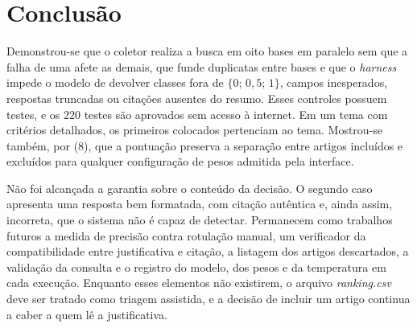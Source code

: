 \documentclass[10pt,a4paper,twocolumn]{article}
\newcommand{\cod}[1]{\textit{#1}}
\begin{document}
\section{Conclusão}

Demonstrou-se que o coletor realiza a busca em oito bases em paralelo sem que a falha de uma afete as demais, que funde duplicatas entre bases e que o \emph{harness} impede o modelo de devolver classes fora de $\{0;\,0{,}5;\,1\}$, campos inesperados, respostas truncadas ou citações ausentes do resumo. Esses controles possuem testes, e os 220 testes são aprovados sem acesso à internet. Em um tema com critérios detalhados, os primeiros colocados pertenciam ao tema. Mostrou-se também, por (8), que a pontuação preserva a separação entre artigos incluídos e excluídos para qualquer configuração de pesos admitida pela interface.

Não foi alcançada a garantia sobre o conteúdo da decisão. O segundo caso apresenta uma resposta bem formatada, com citação autêntica e, ainda assim, incorreta, que o sistema não é capaz de detectar. Permanecem como trabalhos futuros a medida de precisão contra rotulação manual, um verificador da compatibilidade entre justificativa e citação, a listagem dos artigos descartados, a validação da consulta e o registro do modelo, dos pesos e da temperatura em cada execução. Enquanto esses elementos não existirem, o arquivo \cod{ranking.csv} deve ser tratado como triagem assistida, e a decisão de incluir um artigo continua a caber a quem lê a justificativa.

\end{document}
